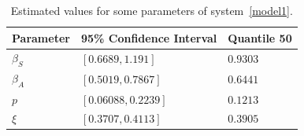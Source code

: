 




\begin{table}[h!]
\begin{center}
	\begin{tabular}{>{\centering}p{}p{}p{}}
		\toprule
	    Parameter & 95\% Confidence Interval & Quantile 50
			\\
			\midrule
      $\beta_S$ & $[0.6689, 1.191]$   &  $0.9303$ \\
      $\beta_A$ & $[0.5019, 0.7867]$  &  $0.6441$ \\
      $p$       & $[0.06088, 0.2239]$ &  $0.1213$ \\
      $\xi$     & $[0.3707, 0.4113]$  & $0.3905$  \\
			\bottomrule
	\end{tabular}
  \caption{Estimated values for some parameters of system~\ref{model1}.}\label{table_icparam}
\end{center}
\end{table}

